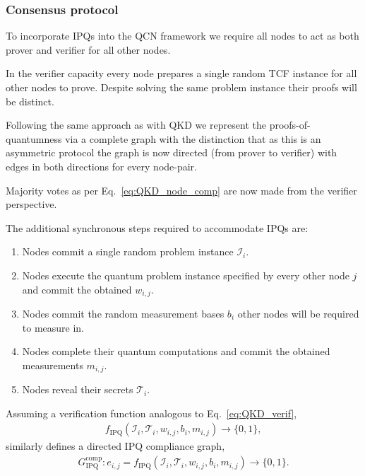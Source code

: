 \documentclass[twocolumn, aps, amsmath, amssymb, nofootinbib, superscriptaddress, longbibliography, floatfix, eqsecnum, rmp]{revtex4-2}
\begin{document}
\subsubsection{Consensus protocol}

To incorporate IPQs into the QCN framework we require all nodes to act as both prover and verifier for all other nodes.

In the verifier capacity every node prepares a single random TCF instance for all other nodes to prove. Despite solving the same problem instance their proofs will be distinct.

Following the same approach as with QKD we represent the proofs-of-quantumness via a complete graph with the distinction that as this is an asymmetric protocol the graph is now directed (from prover to verifier) with edges in both directions for every node-pair.

Majority votes as per Eq.~\eqref{eq:QKD_node_comp} are now made from the verifier perspective.

The additional synchronous steps required to accommodate IPQs are:
\begin{enumerate}
	\item Nodes commit a single random problem instance $\mathcal{I}_i$.
	\item Nodes execute the quantum problem instance specified by every other node $j$ and commit the obtained $w_{i,j}$.
	\item Nodes commit the random measurement bases $b_i$ other nodes will be required to measure in.
	\item Nodes complete their quantum computations and commit the obtained measurements $m_{i,j}$.
	\item Nodes reveal their secrets $\mathcal{T}_i$.
\end{enumerate}
	
Assuming a verification function analogous to Eq.~\eqref{eq:QKD_verif},
\begin{align}
	f_\mathrm{IPQ}(\mathcal{I}_i,\mathcal{T}_i,w_{i,j},b_i,m_{i,j}) \to \{0,1\},
\end{align}
similarly defines a directed IPQ compliance graph,
\begin{align}
	G_\mathrm{IPQ}^{\mathrm{comp}}: e_{i,j} = f_\mathrm{IPQ}(\mathcal{I}_i,\mathcal{T}_i,w_{i,j},b_i,m_{i,j}) \to \{0,1\}.
\end{align}
	
\end{document}
